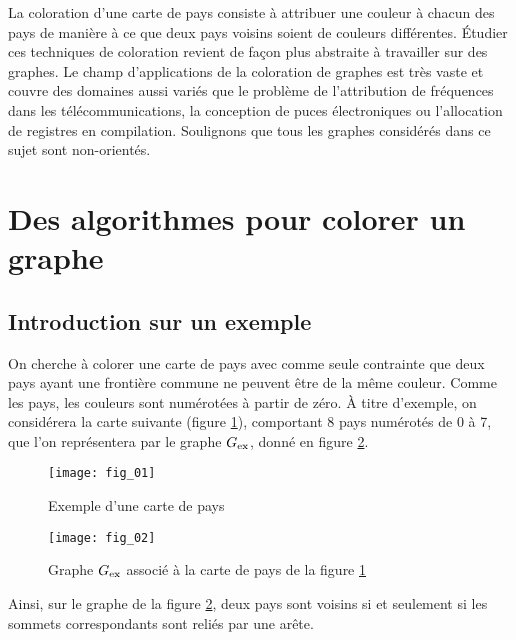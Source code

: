 

\ifprof
\else
La coloration d'une carte de pays consiste à attribuer une couleur à chacun des pays de manière à ce que deux pays voisins soient de couleurs différentes.
Étudier ces techniques de coloration revient de façon plus abstraite à travailler sur des graphes.
Le champ d'applications de la coloration de graphes est très vaste et couvre des domaines aussi variés que le problème de l'attribution de fréquences dans les télécommunications, la conception de puces électroniques ou l'allocation de registres en compilation.
Soulignons que tous les graphes considérés dans ce sujet sont non-orientés. %
\fi

\section{Des algorithmes pour colorer un graphe \label{2024_CCINP_TSI_Info_sec_01}}
\subsection{Introduction sur un exemple \label{2024_CCINP_TSI_Info_sec_01_1}}

\ifprof
\else
On cherche à colorer une carte de pays avec comme seule contrainte que deux pays ayant une frontière commune ne peuvent être de la même couleur.
Comme les pays, les couleurs sont numérotées à partir de zéro.
À titre d'exemple, on considérera la carte suivante (figure \ref{2024_CCINP_TSI_Info_fig_01}), comportant 8 pays numérotés de 0 à 7, que l'on représentera par le graphe ${G}_{\text{ex}}$, donné en figure \ref{2024_CCINP_TSI_Info_fig_02}.

\begin{figure}[!h]
\centering
\texttt{[image: fig\_01]}
\caption{Exemple d'une carte de pays \label{2024_CCINP_TSI_Info_fig_01}}
\end{figure}

\begin{figure}[!h]
\centering
\texttt{[image: fig\_02]}
\caption{Graphe ${G}_{\text{ex}}$ associé à la carte de pays de la figure \ref{2024_CCINP_TSI_Info_fig_01}\label{2024_CCINP_TSI_Info_fig_02}}
\end{figure}

Ainsi, sur le graphe de la figure \ref{2024_CCINP_TSI_Info_fig_02}, deux pays sont voisins si et seulement si les sommets correspondants sont reliés par une arête.
\fi


